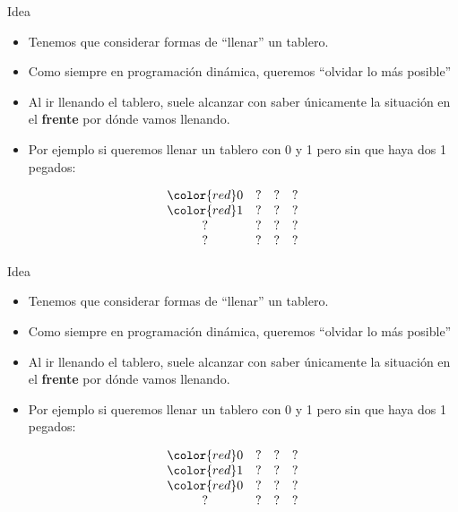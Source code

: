 \documentclass{beamer}
\begin{document}
\begin{frame}{Idea}
    \begin{itemize}
		\item Tenemos que considerar formas de ``llenar'' un tablero.
		\item Como siempre en programación dinámica, queremos ``olvidar lo más posible''
		\item Al ir llenando el tablero, suele alcanzar con saber únicamente la situación en el \textbf{frente} por dónde vamos llenando.
		\item Por ejemplo si queremos llenar un tablero con 0 y 1 pero sin que haya dos 1 pegados:
    \end{itemize}
    $$\begin{array}{cccc}
		\color{red}0 & ? & ? & ? \\
		\color{red}1 & ? & ? & ? \\
		? & ? & ? & ? \\
		? & ? & ? & ? \\
    \end{array}$$
\end{frame}


\begin{frame}{Idea}
    \begin{itemize}
		\item Tenemos que considerar formas de ``llenar'' un tablero.
		\item Como siempre en programación dinámica, queremos ``olvidar lo más posible''
		\item Al ir llenando el tablero, suele alcanzar con saber únicamente la situación en el \textbf{frente} por dónde vamos llenando.
		\item Por ejemplo si queremos llenar un tablero con 0 y 1 pero sin que haya dos 1 pegados:
    \end{itemize}
    $$\begin{array}{cccc}
		\color{red}0 & ? & ? & ? \\
		\color{red}1 & ? & ? & ? \\
		\color{red}0 & ? & ? & ? \\
		? & ? & ? & ? \\
    \end{array}$$
\end{frame}
\end{document}

